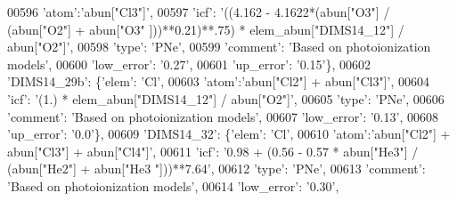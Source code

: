 \begin{DoxyCode}
00596                                        \textcolor{stringliteral}{'atom'}:\textcolor{stringliteral}{'abun["Cl3"]'}, 
00597                                        \textcolor{stringliteral}{'icf'}: \textcolor{stringliteral}{'((4.162 - 4.1622*(abun["O3"] / (abun["O2"] + abun["O3"
      ]))**0.21)**.75) * elem\_abun["DIMS14\_12"] / abun["O2"]'},
00598                                        \textcolor{stringliteral}{'type'}: \textcolor{stringliteral}{'PNe'},
00599                                        \textcolor{stringliteral}{'comment'}: \textcolor{stringliteral}{'Based on photoionization models'},
00600                                        \textcolor{stringliteral}{'low\_error'}: \textcolor{stringliteral}{'0.27'},
00601                                        \textcolor{stringliteral}{'up\_error'}: \textcolor{stringliteral}{'0.15'}\},
00602                          \textcolor{stringliteral}{'DIMS14\_29b'}: \{\textcolor{stringliteral}{'elem'}: \textcolor{stringliteral}{'Cl'},
00603                                        \textcolor{stringliteral}{'atom'}:\textcolor{stringliteral}{'abun["Cl2"] + abun["Cl3"]'}, 
00604                                        \textcolor{stringliteral}{'icf'}: \textcolor{stringliteral}{'(1.) * elem\_abun["DIMS14\_12"] / abun["O2"]'},
00605                                        \textcolor{stringliteral}{'type'}: \textcolor{stringliteral}{'PNe'},
00606                                        \textcolor{stringliteral}{'comment'}: \textcolor{stringliteral}{'Based on photoionization models'},
00607                                        \textcolor{stringliteral}{'low\_error'}: \textcolor{stringliteral}{'0.13'},
00608                                        \textcolor{stringliteral}{'up\_error'}: \textcolor{stringliteral}{'0.0'}\},
00609                          \textcolor{stringliteral}{'DIMS14\_32'}: \{\textcolor{stringliteral}{'elem'}: \textcolor{stringliteral}{'Cl'},
00610                                        \textcolor{stringliteral}{'atom'}:\textcolor{stringliteral}{'abun["Cl2"] + abun["Cl3"] + abun["Cl4"]'}, 
00611                                        \textcolor{stringliteral}{'icf'}: \textcolor{stringliteral}{'0.98 + (0.56 - 0.57 * abun["He3"] / (abun["He2"] + abun["He3
      "]))**7.64'},
00612                                        \textcolor{stringliteral}{'type'}: \textcolor{stringliteral}{'PNe'},
00613                                        \textcolor{stringliteral}{'comment'}: \textcolor{stringliteral}{'Based on photoionization models'},
00614                                        \textcolor{stringliteral}{'low\_error'}: \textcolor{stringliteral}{'0.30'},

\end{DoxyCode}
